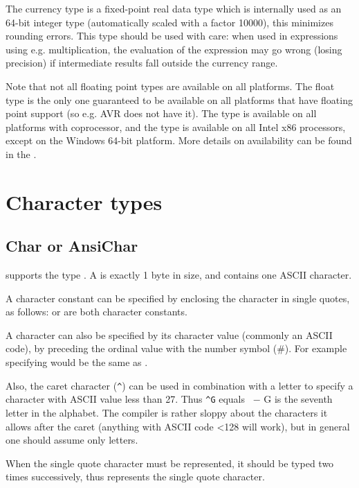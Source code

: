 The currency type is a fixed-point real data type which is internally used
as an 64-bit integer type (automatically scaled with a factor 10000), this
minimizes rounding errors. This type should be used with care: when used in
expressions using e.g. multiplication, the evaluation of the expression may
go wrong (losing precision) if intermediate results fall outside the currency range.

Note that not all floating point types are available on all platforms. 
The  float type is the only one guaranteed to be available on all
platforms that have floating point support (so e.g. AVR does not have it).
The  type is available on all platforms with coprocessor,
and the  type is available on all Intel x86 processors,
except on the Windows 64-bit platform.  More details on availability can be
found in the \progref.

\section{Character types}
\label{se:charactertypes}
\subsection{Char or AnsiChar}
 
\fpc supports the type . A  is exactly 1 byte in
size, and contains one ASCII character.

A character constant can be specified by enclosing the character in single
quotes, as follows:  or  are both character constants.

A character can also be specified by its character
value (commonly an ASCII code), by preceding the ordinal value with the
number symbol (\#). For example specifying  would be the same as .

Also, the caret character (\verb+^+) can be used in combination with a letter to
specify a character with ASCII value less than 27. Thus \verb+^G+ equals
~$-$ G is the seventh letter in the alphabet. The compiler is rather
sloppy about the characters it allows after the caret (anything with ASCII
code <128 will work), but in general one should assume only letters.

When the single quote character must be represented, it should be typed
two times successively, thus  represents the single quote character.

